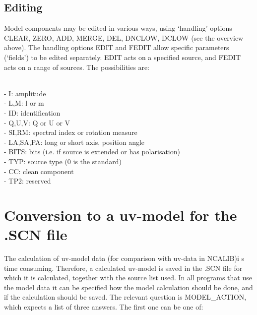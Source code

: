 \newpage
\subsection{Editing}
\label{mdl.descr.handle-edit}

Model components may be edited in various ways, using `handling' options
CLEAR, ZERO, ADD, MERGE, DEL, DNCLOW, DCLOW (see the overview above).
The handling options EDIT and FEDIT allow specific parameters (`fields')
to be edited separately. EDIT acts on a specified source, and FEDIT acts
on a range of sources. The possibilities are:

~\\- I:  amplitude
~\\- L,M:  l or m
~\\- ID:  identification
~\\- Q,U,V:  Q or U or V
~\\- SI,RM:  spectral index or rotation measure
~\\- LA,SA,PA: long or short axis, position angle
~\\- BITS:  bits (i.e. if source is extended or has polarisation)
~\\- TYP:  source type (0 is the standard)
~\\- CC:  clean component
~\\- TP2:  reserved
 


\newpage
\section{Conversion to a uv-model for the .SCN file}
\label{mdl.descr.uvmodel}

The calculation of uv-model data (for comparison with uv-data in NCALIB)i
s time consuming. Therefore, a calculated uv-model
is saved in the .SCN file for which it is calculated, together with the source
list used. In all programs that use the model data it can be specified how the
model calculation should be done, and if the calculation should be saved. The
relevant question is MODEL\_ACTION, which expects a list of three answers. The
first one can be one of:

